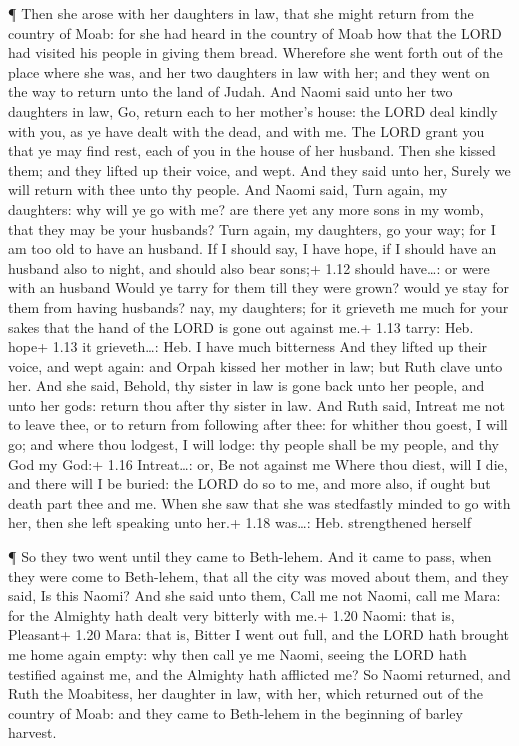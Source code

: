 ¶ Then she arose with her daughters in law, that she might
return from the country of Moab: for she had heard in the country of
Moab how that the LORD had visited his people in giving them bread.
 Wherefore she went forth out of the place where she was,
and her two daughters in law with her; and they went on the way to
return unto the land of Judah.  And Naomi said unto her two
daughters in law, Go, return each to her mother's house: the LORD deal
kindly with you, as ye have dealt with the dead, and with me.
 The LORD grant you that ye may find rest, each of you in
the house of her husband. Then she kissed them; and they lifted up their
voice, and wept.  And they said unto her, Surely we will
return with thee unto thy people.  And Naomi said, Turn
again, my daughters: why will ye go with me? are there yet any more sons
in my womb, that they may be your husbands?  Turn again, my
daughters, go your way; for I am too old to have an husband. If I should
say, I have hope, if I should have an husband also to night, and should
also bear sons;+ 1.12 should have\ldots: or were with an husband
 Would ye tarry for them till they were grown? would ye
stay for them from having husbands? nay, my daughters; for it grieveth
me much for your sakes that the hand of the LORD is gone out against
me.+ 1.13 tarry: Heb. hope+ 1.13 it grieveth\ldots: Heb. I have much
bitterness  And they lifted up their voice, and wept again:
and Orpah kissed her mother in law; but Ruth clave unto her.
 And she said, Behold, thy sister in law is gone back unto
her people, and unto her gods: return thou after thy sister in law.
 And Ruth said, Intreat me not to leave thee, or to return
from following after thee: for whither thou goest, I will go; and where
thou lodgest, I will lodge: thy people shall be my people, and thy God
my God:+ 1.16 Intreat\ldots: or, Be not against me  Where
thou diest, will I die, and there will I be buried: the LORD do so to
me, and more also, if ought but death part thee and me. 
When she saw that she was stedfastly minded to go with her, then she
left speaking unto her.+ 1.18 was\ldots: Heb. strengthened herself

 ¶ So they two went until they came to Beth-lehem. And it
came to pass, when they were come to Beth-lehem, that all the city was
moved about them, and they said, Is this Naomi?  And she
said unto them, Call me not Naomi, call me Mara: for the Almighty hath
dealt very bitterly with me.+ 1.20 Naomi: that is, Pleasant+ 1.20 Mara:
that is, Bitter  I went out full, and the LORD hath brought
me home again empty: why then call ye me Naomi, seeing the LORD hath
testified against me, and the Almighty hath afflicted me? 
So Naomi returned, and Ruth the Moabitess, her daughter in law, with
her, which returned out of the country of Moab: and they came to
Beth-lehem in the beginning of barley harvest.

